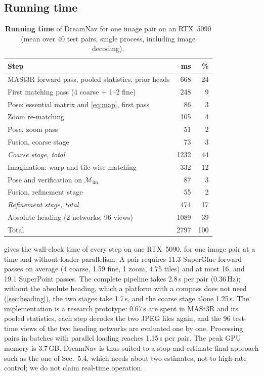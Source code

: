 \documentclass[10pt,twocolumn,letterpaper]{article}
\begin{document}
\subsection{Running time}
\label{sec:runtime}

\begin{table}[t]
\centering
\caption{\textbf{Running time} of DreamNav for one image pair on an RTX~5090 (mean over 40 test pairs, single process, including image decoding).}
\label{tab:runtime}
\footnotesize
\setlength{\tabcolsep}{4pt}
\begin{tabular}{@{}lrr@{}}
\toprule
Step & ms & \% \\
\midrule
MASt3R forward pass, pooled statistics, prior heads & 668 & 24 \\
First matching pass (4 coarse + 1--2 fine) & 248 & 9 \\
Pose: essential matrix and \cref{eq:map}, first pass & 86 & 3 \\
Zoom re-matching & 105 & 4 \\
Pose, zoom pass & 51 & 2 \\
Fusion, coarse stage & 73 & 3 \\
\rowcolor{rowgray} \emph{Coarse stage, total} & 1232 & 44 \\
Imagination: warp and tile-wise matching & 332 & 12 \\
Pose and verification on $\mathcal{M}_{\mathrm{im}}$ & 87 & 3 \\
Fusion, refinement stage & 55 & 2 \\
\rowcolor{rowgray} \emph{Refinement stage, total} & 474 & 17 \\
Absolute heading (2 networks, 96 views) & 1089 & 39 \\
\midrule
Total & 2797 & 100 \\
\bottomrule
\end{tabular}
\end{table}

 gives the wall-clock time of every step on one RTX~5090, for one image pair at a time and without loader parallelism. A pair requires 11.3 SuperGlue forward passes on average (4 coarse, 1.59 fine, 1 zoom, 4.75 tiles) and at most 16, and 19.1 SuperPoint passes. The complete pipeline takes 2.8\,s per pair (0.36\,Hz); without the absolute heading, which a platform with a compass does not need (\cref{sec:heading}), the two stages take 1.7\,s, and the coarse stage alone 1.25\,s. The implementation is a research prototype: 0.67\,s are spent in MASt3R and its pooled statistics, each step decodes the two JPEG files again, and the 96 test-time views of the two heading networks are evaluated one by one. Processing pairs in batches with parallel loading reaches 1.15\,s per pair. The peak GPU memory is 3.7\,GB. DreamNav is thus suited to a stop-and-estimate final approach such as the one of Sec.~5.4, which needs about two estimates, not to high-rate control; we do not claim real-time operation.
\end{document}
